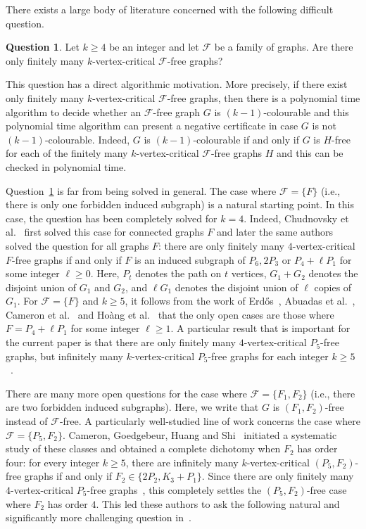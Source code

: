 \documentclass[10pt]{article}
\theoremstyle{definition}
\newtheorem{question}[problem]{Question}
\begin{document}
There exists a large body of literature concerned with the following difficult question.
\begin{question}
\label{ques:mainQuestion}
Let $k \geq 4$ be an integer and let $\mathcal{F}$ be a family of graphs. Are there only
finitely many $k$-vertex-critical $\mathcal{F}$-free graphs?
\end{question}

This question has a direct algorithmic motivation. More precisely, if there exist only
finitely many $k$-vertex-critical $\mathcal{F}$-free graphs, then there is a polynomial time algorithm to decide whether an $\mathcal{F}$-free graph $G$ is $(k-1)$-colourable and this polynomial time algorithm can present a negative certificate in case $G$ is not $(k-1)$-colourable. Indeed, $G$ is $(k-1)$-colourable if and only if $G$ is $H$-free for each of the finitely many $k$-vertex-critical $\mathcal{F}$-free graphs $H$ and this can be checked in polynomial time.

Question~\ref{ques:mainQuestion} is far from being solved in general. The case where $\mathcal{F}=\{F\}$ (i.e., there is only one forbidden induced subgraph) is a natural starting point. In this case, the question has been completely solved for $k=4$. Indeed, Chudnovsky et al.~\cite{CGSZ20a} first solved this case for connected graphs $F$ and later the same authors~\cite{CGSZ20b} solved the question for all graphs $F$: there are only finitely many $4$-vertex-critical $F$-free graphs if and only if $F$ is an induced subgraph of $P_6, 2P_3$ or $P_4 + \ell P_1$ for some integer $\ell \geq 0$. Here, $P_t$ denotes the path on $t$ vertices, $G_1+G_2$ denotes the disjoint union of $G_1$ and $G_2$, and $\ell G_1$ denotes the disjoint union of $\ell$ copies of $G_1$. For $\mathcal{F}=\{F\}$ and $k \geq 5$, it follows from the work of Erd{\H{o}}s~\cite{E59}, Abuadas et al.~\cite{ACHS24}, Cameron et al.~\cite{CHS22} and Ho{\`a}ng et al.~\cite{HMRSV15} that the only open cases are those where $F=P_4+\ell P_1$ for some integer $\ell \geq 1$. A particular result that is important for the current paper is that there are only finitely many $4$-vertex-critical $P_5$-free graphs, but infinitely many $k$-vertex-critical $P_5$-free graphs for each integer $k \geq 5$~\cite{HMRSV15}.

There are many more open questions for the case where $\mathcal{F}=\{F_1,F_2\}$ (i.e., there are two forbidden induced subgraphs). Here, we write that $G$ is $(F_1,F_2)$-free instead of $\mathcal{F}$-free. A particularly well-studied line of work concerns the case where $\mathcal{F}=\{P_5,F_2\}$. Cameron, Goedgebeur, Huang and Shi~\cite{CGHS21} initiated a systematic
study of these classes and obtained a complete dichotomy when $F_2$ has order
four: for every integer $k \geq 5$, there are infinitely many $k$-vertex-critical $(P_5,F_2)$-free graphs if and only if $F_2 \in \{2P_2,K_3+P_1\}$. Since there are only finitely many $4$-vertex-critical $P_5$-free graphs~\cite{HMRSV15}, this completely settles the $(P_5,F_2)$-free case where $F_2$ has order $4$. This led these authors to ask the following natural and significantly more challenging question in~\cite{CGHS21}.
\end{document}
